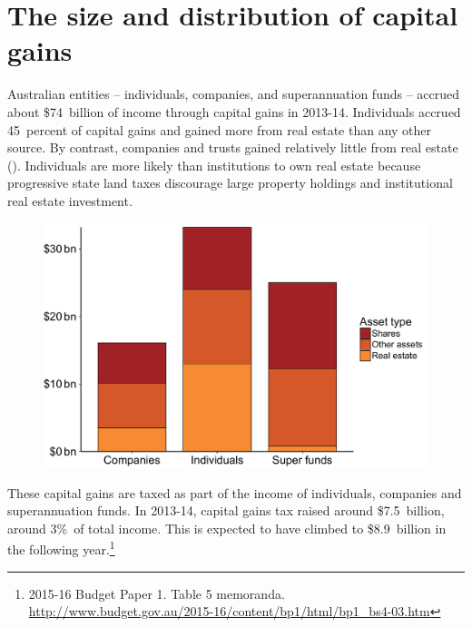 \section{The size and distribution of capital gains}




Australian entities -- individuals, companies, and superannuation funds -- accrued about \$74~billion of income through capital gains in 2013-14. Individuals accrued 45~percent
of capital gains and gained more from real estate than any other source. By contrast, companies and trusts gained relatively little from real estate (). Individuals are more likely than institutions to own real estate because progressive state land taxes discourage large property holdings and institutional real estate investment.


\begin{figure}[htbp]
\label{fig:CGT-by-entity-asset}
\includegraphics[width=\columnwidth]{CGT-NG-atlas//CGT-by-entity-asset-1}

\end{figure}

These capital gains are taxed as part of the income of individuals, companies and superannuation funds. In 2013-14, capital gains tax raised around \$7.5~billion, around 3\%\ of total income. This is expected to have climbed to \$8.9~billion in the following year.\footnote{2015-16 Budget Paper 1. Table 5 memoranda. \url{http://www.budget.gov.au/2015-16/content/bp1/html/bp1_bs4-03.htm}}

